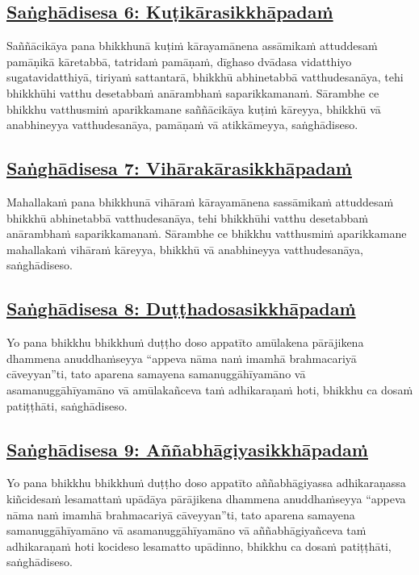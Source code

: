 \subsection*{\hyperref[comm6]{Saṅghādisesa 6: Kuṭikārasikkhāpadaṁ}}
\label{sd6}
Saññācikāya pana bhikkhunā kuṭiṁ kārayamānena assāmikaṁ attuddesaṁ pamāṇikā kāretabbā, tatridaṁ pamāṇaṁ, dīghaso dvādasa vidatthiyo sugatavidatthiyā, tiriyaṁ sattantarā, bhikkhū abhinetabbā vatthudesanāya, tehi bhikkhūhi vatthu desetabbaṁ anārambhaṁ saparikkamanaṁ. Sārambhe ce bhikkhu vatthusmiṁ aparikkamane saññācikāya kuṭiṁ kāreyya, bhikkhū vā anabhineyya vatthudesanāya, pamāṇaṁ vā atikkāmeyya, saṅghādiseso.

\subsection*{\hyperref[comm7]{Saṅghādisesa 7: Vihārakārasikkhāpadaṁ}}
\label{sd7}
Mahallakaṁ pana bhikkhunā vihāraṁ kārayamānena sassāmikaṁ attuddesaṁ bhikkhū abhinetabbā vatthudesanāya, tehi bhikkhūhi vatthu desetabbaṁ anārambhaṁ saparikkamanaṁ. Sārambhe ce bhikkhu vatthusmiṁ aparikkamane mahallakaṁ vihāraṁ kāreyya, bhikkhū vā anabhineyya vatthudesanāya, saṅghādiseso.

\subsection*{\hyperref[comm8]{Saṅghādisesa 8: Duṭṭhadosasikkhāpadaṁ}}
\label{sd8}
Yo pana bhikkhu bhikkhuṁ duṭṭho doso appatīto amūlakena pārājikena dhammena anuddhaṁseyya “appeva nāma naṁ imamhā brahmacariyā cāveyyan''ti, tato aparena samayena samanuggāhīyamāno vā asamanuggāhīyamāno vā amūlakañceva taṁ adhikaraṇaṁ hoti, bhikkhu ca dosaṁ patiṭṭhāti, saṅghādiseso.

\subsection*{\hyperref[comm9]{Saṅghādisesa 9: Aññabhāgiyasikkhāpadaṁ}}
\label{sd9}
Yo pana bhikkhu bhikkhuṁ duṭṭho doso appatīto aññabhāgiyassa adhikaraṇassa kiñcidesaṁ lesamattaṁ upādāya pārājikena dhammena anuddhaṁseyya “appeva nāma naṁ imamhā brahmacariyā cāveyyan''ti, tato aparena samayena samanuggāhīyamāno vā asamanuggāhīyamāno vā aññabhāgiyañceva taṁ adhikaraṇaṁ hoti kocideso lesamatto upādinno, bhikkhu ca dosaṁ patiṭṭhāti, saṅghādiseso.

